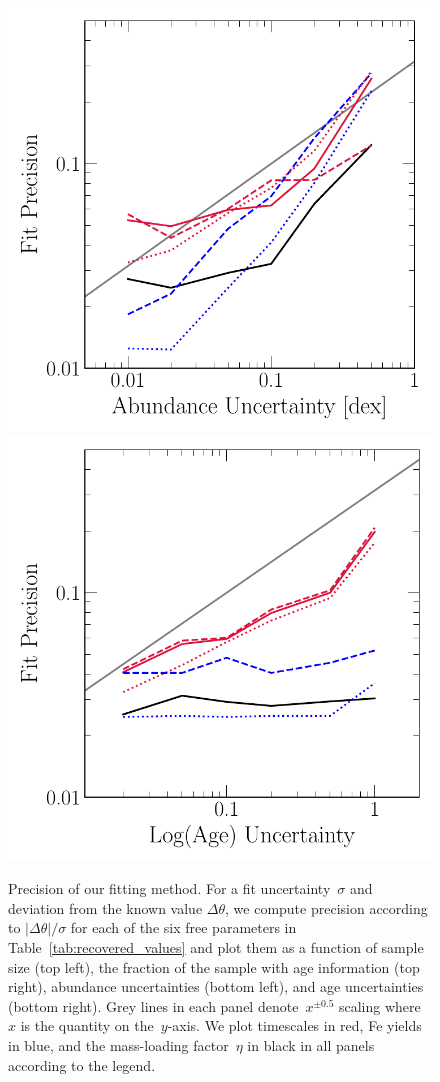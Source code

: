 \documentclass[ms.tex]{subfiles}
\begin{document}
\begin{figure}
\includegraphics[scale = 0.55]{precision_abundanceuncertainty.pdf}
\includegraphics[scale = 0.55]{precision_ageuncertainty.pdf}
\caption{
Precision of our fitting method.
For a fit uncertainty~$\sigma$ and deviation from the known value
$\Delta\theta$, we compute precision according to
$\left|\Delta\theta\right| / \sigma$ for each of the six free parameters
in Table~\ref{tab:recovered_values} and plot them as a function
of sample size (top left), the fraction of the sample with age information (top
right), abundance uncertainties (bottom left), and age uncertainties (bottom
right).
Grey lines in each panel denote~$x^{\pm0.5}$ scaling where~$x$ is the quantity
on the~$y$-axis.
We plot timescales in red, Fe yields in blue, and the mass-loading
factor~$\eta$ in black in all panels according to the legend.
}
\label{fig:precision}
\end{figure}
\end{document}
